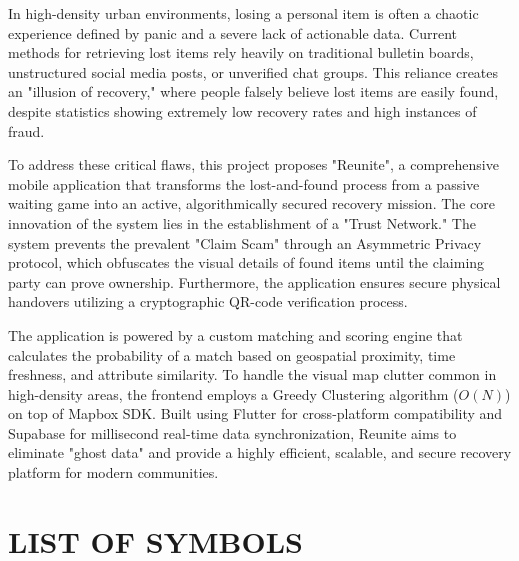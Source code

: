 \documentclass[12pt,a4paper]{report}
\begin{document}
In high-density urban environments, losing a personal item is often a chaotic experience defined by panic and a severe lack of actionable data. Current methods for retrieving lost items rely heavily on traditional bulletin boards, unstructured social media posts, or unverified chat groups. This reliance creates an "illusion of recovery," where people falsely believe lost items are easily found, despite statistics showing extremely low recovery rates and high instances of fraud.

To address these critical flaws, this project proposes "Reunite", a comprehensive mobile application that transforms the lost-and-found process from a passive waiting game into an active, algorithmically secured recovery mission. The core innovation of the system lies in the establishment of a "Trust Network." The system prevents the prevalent "Claim Scam" through an Asymmetric Privacy protocol, which obfuscates the visual details of found items until the claiming party can prove ownership. Furthermore, the application ensures secure physical handovers utilizing a cryptographic QR-code verification process. 

The application is powered by a custom matching and scoring engine that calculates the probability of a match based on geospatial proximity, time freshness, and attribute similarity. To handle the visual map clutter common in high-density areas, the frontend employs a Greedy Clustering algorithm ($O(N)$) on top of Mapbox SDK. Built using Flutter for cross-platform compatibility and Supabase for millisecond real-time data synchronization, Reunite aims to eliminate "ghost data" and provide a highly efficient, scalable, and secure recovery platform for modern communities.

\newpage

\tableofcontents

\newpage
{}
\renewcommand{\listfigurename}{LIST OF FIGURES}
\listoffigures

\newpage
{}
\renewcommand{\listtablename}{LIST OF TABLES}
\listoftables

\newpage

\chapter*{LIST OF SYMBOLS}
{}
\end{document}

